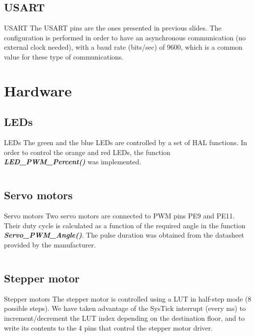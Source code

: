 \documentclass[aspectratio=169]{beamer}
\newcommand{\inputCcode}[2][c]{\inputminted[frame=lines,
                                           framesep=2mm,
                                           baselinestretch=1.2,
                                           bgcolor=black!5,
                                           linenos,
                                           fontsize=\scriptsize,
                                           obeytabs=true,
                                           tabsize=4
                                           ]{#1}{#2}}
\begin{document}
\subsection{USART}
\begin{frame}{USART}
    The USART pins are the ones presented in previous slides. The configuration is performed in order to have an asynchronous communication (no external clock needed), with a baud rate (bits/sec) of 9600, which is a common value for these type of communications.
\end{frame}

\section{Hardware}
\subsection{LEDs}
\begin{frame}[fragile]{LEDs}
    The green and the blue LEDs are controlled by a set of HAL functions. In order to control the orange and red LEDs, the function \textbf{\textit{LED\_PWM\_Percent()}} was implemented.
    
    \inputCcode{Code/LED_PWM_Percent.c}
\end{frame}

\subsection{Servo motors}
\begin{frame}[fragile]{Servo motors}
    Two servo motors are connected to PWM pins PE9 and PE11. Their duty cycle is calculated as a function of the required angle in the function \textbf{\textit{Servo\_PWM\_Angle()}}. The pulse duration was obtained from the datasheet~\autocite{Parallax} provided by the manufacturer.
    
    \inputCcode{Code/Servo_PWM_Angle.c}
    
\end{frame}

\subsection{Stepper motor}
\begin{frame}[fragile]{Stepper motors}
    The stepper motor is controlled using a LUT in half-step mode (8 possible steps). We have taken advantage of the SysTick interrupt (every ms) to increment/decrement the LUT index depending on the destination floor, and to write its contents to the 4 pins that control the stepper motor driver.
    \inputCcode{Code/SysTick_Handler.c}
\end{frame}
\end{document}
